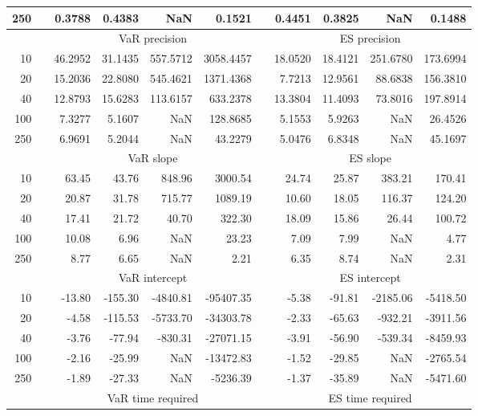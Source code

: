 {\begin{table}[h]
\begin{tabular}{rr rrrr r rrrr}
250 && 0.3788  & 0.4383  &    NaN & 0.1521 && 0.4451  & 0.3825  &    NaN & 0.1488 \\ 
\hline 
 & & \multicolumn{4}{c}{VaR precision} &&  \multicolumn{4}{c}{ES precision} \\ \cline{3-6}  \cline{8-11}
10 && 46.2952  & 31.1435  & 557.5712 & 3058.4457 & & 18.0520  & 18.4121  & 251.6780 & 173.6994 \\ 
20 && 15.2036  & 22.8080  & 545.4621 & 1371.4368 & & 7.7213  & 12.9561  & 88.6838 & 156.3810 \\ 
40 && 12.8793  & 15.6283  & 113.6157 & 633.2378 & & 13.3804  & 11.4093  & 73.8016 & 197.8914 \\ 
100 && 7.3277  & 5.1607  &    NaN & 128.8685 & & 5.1553  & 5.9263  &    NaN & 26.4526 \\ 
250 && 6.9691  & 5.2044  &    NaN & 43.2279 & & 5.0476  & 6.8348  &    NaN & 45.1697 \\ 
\hline 
 & & \multicolumn{4}{c}{ VaR slope} &&  \multicolumn{4}{c}{ES slope} \\ \cline{3-6}  \cline{8-11}
10 && 63.45  & 43.76  & 848.96 & 3000.54 && 24.74  & 25.87  & 383.21 & 170.41 \\ 
20 && 20.87  & 31.78  & 715.77 & 1089.19 && 10.60  & 18.05  & 116.37 & 124.20 \\ 
40 && 17.41  & 21.72  & 40.70 & 322.30 && 18.09  & 15.86  & 26.44 & 100.72 \\ 
100 && 10.08  & 6.96  &  NaN & 23.23 && 7.09  & 7.99  &  NaN & 4.77 \\ 
250 && 8.77  & 6.65  &  NaN & 2.21 && 6.35  & 8.74  &  NaN & 2.31 \\ 
\hline 
 & & \multicolumn{4}{c}{ VaR intercept} &&  \multicolumn{4}{c}{ES intercept} \\ \cline{3-6}  \cline{8-11}
10 && -13.80  & -155.30  & -4840.81 & -95407.35 && -5.38  & -91.81  & -2185.06 & -5418.50 \\ 
20 && -4.58  & -115.53  & -5733.70 & -34303.78 && -2.33  & -65.63  & -932.21 & -3911.56 \\ 
40 && -3.76  & -77.94  & -830.31 & -27071.15 && -3.91  & -56.90  & -539.34 & -8459.93 \\ 
100 && -2.16  & -25.99  &  NaN & -13472.83 && -1.52  & -29.85  &  NaN & -2765.54 \\ 
250 && -1.89  & -27.33  &  NaN & -5236.39 && -1.37  & -35.89  &  NaN & -5471.60 \\ 
\hline 
 & & \multicolumn{4}{c}{VaR time required} && \multicolumn{4}{c}{ES time required} \\ \cline{3-6}  \cline{8-11}

\end{tabular}
\end{table}}
